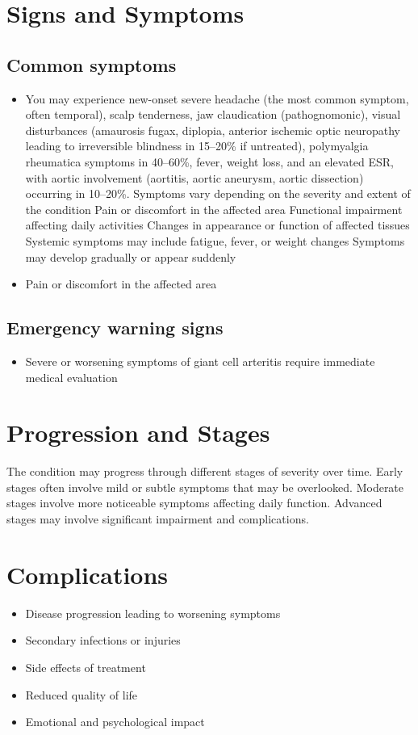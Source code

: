\section{Signs and Symptoms}

\subsection{Common symptoms}
\begin{itemize}[noitemsep]
  \item You may experience new-onset severe headache (the most common symptom, often temporal), scalp tenderness, jaw claudication (pathognomonic), visual disturbances (amaurosis fugax, diplopia, anterior ischemic optic neuropathy leading to irreversible blindness in 15--20\% if untreated), polymyalgia rheumatica symptoms in 40--60\%, fever, weight loss, and an elevated ESR, with aortic involvement (aortitis, aortic aneurysm, aortic dissection) occurring in 10--20\%. Symptoms vary depending on the severity and extent of the condition Pain or discomfort in the affected area Functional impairment affecting daily activities Changes in appearance or function of affected tissues Systemic symptoms may include fatigue, fever, or weight changes Symptoms may develop gradually or appear suddenly
  \item Pain or discomfort in the affected area
  \end{itemize}

\subsection{Emergency warning signs}
\begin{itemize}[noitemsep]
  \item Severe or worsening symptoms of giant cell arteritis require immediate medical evaluation
\end{itemize}
\section{Progression and Stages}
The condition may progress through different stages of severity over time. Early stages often involve mild or subtle symptoms that may be overlooked. Moderate stages involve more noticeable symptoms affecting daily function. Advanced stages may involve significant impairment and complications.
\section{Complications}
\begin{itemize}[noitemsep]
  \item Disease progression leading to worsening symptoms
  \item Secondary infections or injuries
  \item Side effects of treatment
  \item Reduced quality of life
  \item Emotional and psychological impact
\end{itemize}
